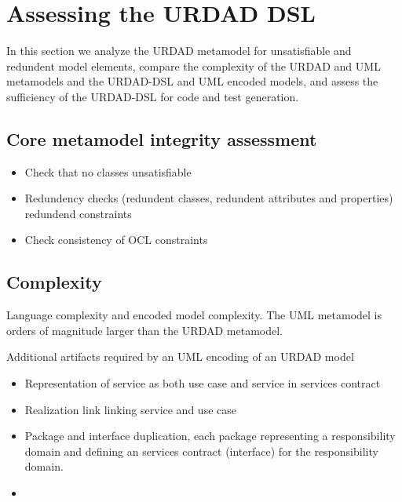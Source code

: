\section{Assessing the URDAD DSL \label{sec:assessment}}

In this section we analyze the URDAD metamodel for unsatisfiable and redundent model elements, compare the complexity of the URDAD and UML metamodels and the URDAD-DSL and UML encoded models, and assess the sufficiency of the URDAD-DSL for code and test generation.


\subsection{Core metamodel integrity assessment}


\begin{itemize}
  \item Check that no classes unsatisfiable
  \item Redundency checks (redundent classes, redundent attributes and properties) redundend constraints
  \item Check consistency of OCL constraints
\end{itemize}


\subsection{Complexity}

Language complexity and encoded model complexity. The UML metamodel is orders of magnitude larger than the URDAD metamodel.

Additional artifacts required by an UML encoding of an URDAD model
\begin{itemize}
  \item Representation of service as both use case and service in services contract
  \item Realization link linking service and use case
  \item Package and interface duplication, each package representing a responsibility domain and defining an services contract (interface) for the responsibility domain.
  \item
\end{itemize}



